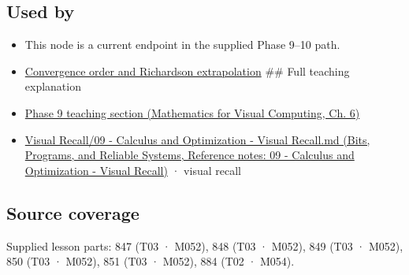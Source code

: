 \subsection{Used by}\label{appendix-e2d7b4f2161d-used-by}

\begin{itemize}
\item
  This node is a current endpoint in the supplied Phase 9--10 path.
\item
  \hyperref[appendix-aca80b6bf17a]{Convergence order and Richardson extrapolation} \#\# Full teaching explanation
\item
  \href{../02-Mathematics-for-Visual-Computing/main.pdf\#nameddest=02-foundations-ii-ch022-numerical-differentiation-and-automatic-differentiation}{Phase 9 teaching section (Mathematics for Visual Computing, Ch. 6)}
\item
  \href{../01-Bits-Programs-and-Reliable-Systems/main.pdf\#nameddest=appendix-adf48f5dc5c1}{Visual Recall/09 - Calculus and Optimization - Visual Recall.md (Bits, Programs, and Reliable Systems, Reference notes: 09 - Calculus and Optimization - Visual Recall)} · visual recall
\end{itemize}

\subsection{Source coverage}\label{appendix-e2d7b4f2161d-source-coverage}

Supplied lesson parts: 847 (T03 · M052), 848 (T03 · M052), 849 (T03 · M052), 850 (T03 · M052), 851 (T03 · M052), 884 (T02 · M054).
